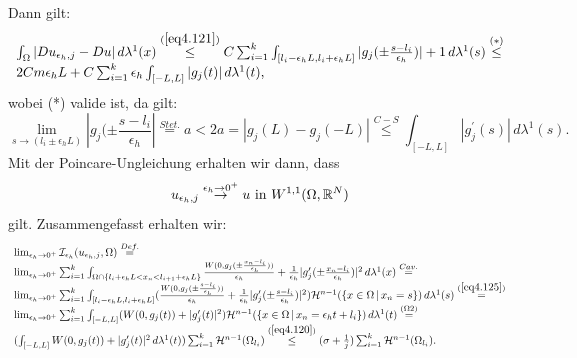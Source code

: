    Dann gilt:
    \begin{equation}
    \begin{array}{l}
        \int_{\Omega} |Du_{\epsilon_h,j} - Du| \,d\lambda^1(x) \stackrel{(\ref{eq4.121})}{\leq} C \sum_{i=1}^k \int_{[l_i - \epsilon_h L, l_i + \epsilon_h L]}|g_j(\pm \frac{s-l_i}{\epsilon_h})| + 1 \,d\lambda^1(s) \stackrel{(*)}{\leq} \\
        2Cm \epsilon_h L + C \sum_{i=1}^k \epsilon_h \int_{[-L,L]} |g_j (t)| \,d\lambda^1(t),
    \end{array}
    \end{equation}
    wobei (*) valide ist, da gilt:
    \begin{equation}
        \lim_{s \to (l_i \pm \epsilon_h L)} |g_j(\pm \frac{s-l_i}{\epsilon_h}| \stackrel{Stet.}{=} a < 2a = |g_j(L) - g_j(-L)| \stackrel{C-S}{\leq} \int_{[-L,L]} |g^{\prime}_j(s)| \,d\lambda^1(s).
    \end{equation}
    Mit der Poincare-Ungleichung erhalten wir dann, dass
    \begin{equation}{\label{eq4.125}}
        u_{\epsilon_h,j} \stackrel{\epsilon_h \to 0^+}{\to} u \text{ in }W^{1,1}(\Omega,\mathbb{R}^N)
    \end{equation}
    gilt. Zusammengefasst erhalten wir:
    \begin{equation}
    \begin{array}{l}
        \lim_{\epsilon_h \to 0^+} \mathcal{I}_{\epsilon_h} (u_{\epsilon_h,j},\Omega) \stackrel{Def.}{=} \\
        \lim_{\epsilon_h \to 0^+} \sum_{i=1}^k \int_{\Omega \cap \{l_i + \epsilon_h L < x_n < l_{i+1} + \epsilon_h L\}} \frac{W(0,g_j(\pm \frac{x_n - l_i}{\epsilon_h}))}{\epsilon_h} + \frac{1}{\epsilon_h} |g^{\prime}_j (\pm \frac{x_n - l_i}{\epsilon_h})|^2 \,d\lambda^1(x) \stackrel{Cav.}{=} \\
        \lim_{\epsilon_h \to 0^+} \sum_{i=1}^k \int_{[l_i - \epsilon_h L, l_i + \epsilon_h L]} (\frac{W(0,g_j(\pm \frac{s - l_i}{\epsilon_h}))}{\epsilon_h} + \frac{1}{\epsilon_h} |g^{\prime}_j (\pm \frac{s - l_i}{\epsilon_h})|^2) \mathcal{H}^{n-1}(\{x \in \Omega \, | \, x_n = s\}) \,d\lambda^1(s) \stackrel{(\ref{eq4.125})}{=}\\
        \lim_{\epsilon_h \to 0^+} \sum_{i=1}^k \int_{[-L,L]} (W(0,g_j(t)) + |g^{\prime}_j(t)|^2) \mathcal{H}^{n-1}(\{x \in \Omega \, | \, x_n = \epsilon_h t + l_i \})\,d\lambda^1(t) \stackrel{(\Omega2)}{=} \\
        (\int_{[-L,L]} W(0,g_j(t)) + |g^{\prime}_j (t)|^2 \,d\lambda^1(t)) \sum_{i=1}^k \mathcal{H}^{n-1}(\Omega_{l_i}) \stackrel{(\ref{eq4.120})}{\leq} (\sigma + \frac{1}{j}) \sum_{i=1}^k \mathcal{H}^{n-1}(\Omega_{l_i}).
    \end{array}
    \end{equation}

